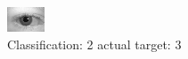 \begin{figure}[h!]
\begin{center}
\includegraphics[width=0.60\columnwidth]{figures/ID553_class_2_target_3.png}
\end{center}
\caption{ Classification: 2 actual target: 3}
\label{fig:ID553_class_2_target_3}
\end{figure}
